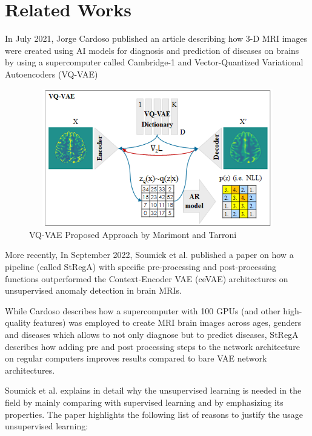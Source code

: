 \section*{Related Works}

In July 2021, Jorge Cardoso published an article describing how 3-D MRI images were created using AI models for diagnosis and prediction of diseases on brains by using a supercomputer called Cambridge-1 and Vector-Quantized Variational Autoencoders (VQ-VAE)

\begin{figure}[ht]
    \hspace*{-0.8in}
    \centering
    \includegraphics[width = 16cm, height = 6cm]{images/vqvae.png}
    \caption[]{VQ-VAE Proposed Approach by Marimont and Tarroni}
    \label{fig:vqvae}
\end{figure}

More recently, In September 2022, Soumick et al. published a paper on how a pipeline (called StRegA) with specific pre-processing and post-processing functions outperformed the Context-Encoder VAE (ceVAE) architectures on unsupervised anomaly detection in brain MRIs.

While Cardoso describes how a supercomputer with 100 GPUs (and other high-quality features) was employed to create MRI brain images across ages, genders and diseases which allows to not only diagnose but to predict diseases, StRegA describes how adding pre and post processing steps to the network architecture on regular computers improves results compared to bare VAE network architectures.

Soumick et al. explains in detail why the unsupervised learning is needed in the field by mainly comparing with supervised learning and by emphasizing its properties. The paper highlights the following list of reasons to justify the usage unsupervised learning:

